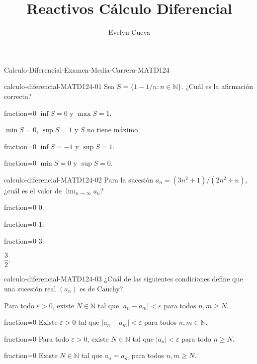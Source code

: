 \documentclass[10pt]{article}
\title{Reactivos Cálculo Diferencial}
\author{Evelyn Cueva}
\begin{document}
\maketitle


\begin{quiz}{Calculo-Diferencial-Examen-Media-Carrera-MATD124}


\begin{multi}[single=true,shuffle=false]{calculo-diferencial-MATD124-01}
Sea $S=\{1-1/n:n\in\mathbb{N}\}$. ¿Cuál es la afirmación correcta?
    \item[fraction=0] $\inf S=0$ y $\max S=1$.
    \item* $\min S=0$, $\sup S=1$ y $S$ no tiene máximo.
    \item[fraction=0] $\inf S=-1$ y $\sup S=1$.
    \item[fraction=0] $\min S=0$ y $\sup S=0$.
\end{multi}


\begin{multi}[single=true,shuffle=false]{calculo-diferencial-MATD124-02}
Para la sucesión $a_n=(3n^2+1)/(2n^2+n)$, ¿cuál es el valor de
$\displaystyle\lim_{n\to\infty}a_n$?
    \item[fraction=0] $0$.
    \item[fraction=0] $1$.
    \item[fraction=0] $3$.
    \item* $\dfrac{3}{2}$.
\end{multi}


\begin{multi}[single=true,shuffle=false]{calculo-diferencial-MATD124-03}
¿Cuál de las siguientes condiciones define que una sucesión
real $(a_n)$ es de Cauchy?
    \item* Para todo $\varepsilon>0$, existe $N\in\mathbb{N}$ tal que
  $|a_n-a_m|<\varepsilon$ para todos $n,m\geq N$.
    \item[fraction=0] Existe $\varepsilon>0$ tal que $|a_n-a_m|<\varepsilon$ para todos
  $n,m\in\mathbb{N}$.
    \item[fraction=0] Para todo $\varepsilon>0$, existe $N\in\mathbb{N}$ tal que
  $|a_n|<\varepsilon$ para todo $n\geq N$.
    \item[fraction=0] Existe $N\in\mathbb{N}$ tal que $a_n=a_m$ para todos $n,m\geq N$.
\end{multi}


\end{quiz}
\end{document}
